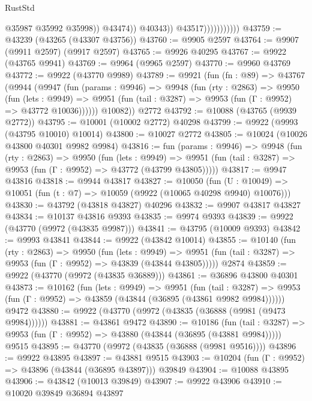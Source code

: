 \begin{lexlean}{RustStd}
\begin{coremodule}
                                      @35987
                                      @35992
                                      @35998))
                                  @43474))
                              @40343))
                          @43517)))))))))))
@43759 := @43239 (@43265 (@43307 @43756))
@43760 := @9905 @2597
@43764 := @9907 (@9911 @2597) (@9917 @2597)
@43765 := @9926 @40295
@43767 := @9922 (@43765 @9941)
@43769 := @9964 (@9965 @2597)
@43770 := @9960 @43769
@43772 := @9922 (@43770 @9989)
@43789 := @9921
    (fun (fn : @89) =>
    @43767
      (@9944
        (@9947
          (fun (params : @9946) =>
          @9948
            (fun (rty : @2863) =>
            @9950
              (fun (lets : @9949) =>
              @9951 (fun (tail : @3287) => @9953 (fun (Γ : @9952) => @43772 @10036))))))
        @10082))
    @2772
@43792 := @10088 (@43765 (@9939 @2772))
@43795 := @10001 (@10002 @2772) @40298
@43799 := @9922 (@9993 (@43795 @10010) @10014)
@43800 := @10027 @2772
@43805 := @10024 (@10026 @43800 @40301 @9982 @9984)
@43816 := fun (params : @9946) =>
  @9948
    (fun (rty : @2863) =>
    @9950
      (fun (lets : @9949) =>
      @9951 (fun (tail : @3287) => @9953 (fun (Γ : @9952) => @43772 (@43799 @43805)))))
@43817 := @9947 @43816
@43818 := @9944 @43817
@43827 := @10050
    (fun (U : @10049) => @10051 (fun (t : @7) => @10059 (@9922 (@10065 @40298 @9940) @10076)))
@43830 := @43792 (@43818 @43827) @40296
@43832 := @9907 @43817 @43827
@43834 := @10137 @43816 @9393
@43835 := @9974 @9393
@43839 := @9922 (@43770 (@9972 (@43835 @9987)))
@43841 := @43795 (@10009 @9393)
@43842 := @9993 @43841
@43844 := @9922 (@43842 @10014)
@43855 := @10140
    (fun (rty : @2863) =>
    @9950
      (fun (lets : @9949) =>
      @9951 (fun (tail : @3287) => @9953 (fun (Γ : @9952) => @43839 (@43844 @43805)))))
    @2874
@43859 := @9922 (@43770 (@9972 (@43835 @36889)))
@43861 := @36896 @43800 @40301
@43873 := @10162
    (fun (lets : @9949) =>
    @9951
      (fun (tail : @3287) =>
      @9953 (fun (Γ : @9952) => @43859 (@43844 (@36895 (@43861 @9982 @9984))))))
    @9472
@43880 := @9922 (@43770 (@9972 (@43835 (@36888 (@9981 (@9473 @9984))))))
@43881 := @43861 @9472
@43890 := @10186
    (fun (tail : @3287) => @9953 (fun (Γ : @9952) => @43880 (@43844 (@36895 (@43881 @9984)))))
    @9515
@43895 := @43770 (@9972 (@43835 (@36888 (@9981 @9516))))
@43896 := @9922 @43895
@43897 := @43881 @9515
@43903 := @10204 (fun (Γ : @9952) => @43896 (@43844 (@36895 @43897))) @39849
@43904 := @10088 @43895
@43906 := @43842 (@10013 @39849)
@43907 := @9922 @43906
@43910 := @10020 @39849 @36894 @43897

\end{coremodule}
\end{lexlean}
